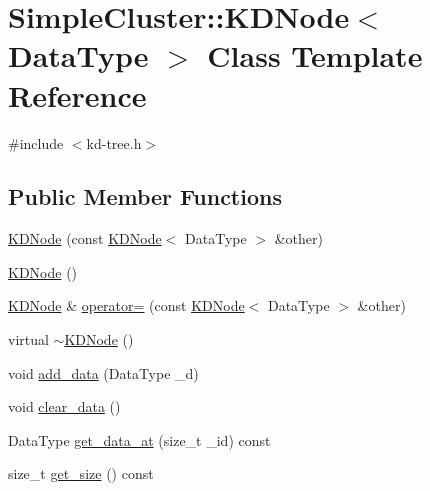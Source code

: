\hypertarget{classSimpleCluster_1_1KDNode}{\section{Simple\+Cluster\+:\+:K\+D\+Node$<$ Data\+Type $>$ Class Template Reference}
\label{classSimpleCluster_1_1KDNode}
}


{\ttfamily \#include $<$kd-\/tree.\+h$>$}

\subsection*{Public Member Functions}
\begin{DoxyCompactItemize}
\item 
\hyperlink{classSimpleCluster_1_1KDNode_a1722141bf4dab3bb456e0a119c61f4eb}{K\+D\+Node} (const \hyperlink{classSimpleCluster_1_1KDNode}{K\+D\+Node}$<$ Data\+Type $>$ \&other)
\item 
\hyperlink{classSimpleCluster_1_1KDNode_acd1e07a0d8bd2d5b9631c4d42cee7e72}{K\+D\+Node} ()
\item 
\hyperlink{classSimpleCluster_1_1KDNode}{K\+D\+Node} \& \hyperlink{classSimpleCluster_1_1KDNode_a7719d6922448ee1c3c4f777117ce48a0}{operator=} (const \hyperlink{classSimpleCluster_1_1KDNode}{K\+D\+Node}$<$ Data\+Type $>$ \&other)
\item 
virtual \hyperlink{classSimpleCluster_1_1KDNode_a997a7e9b6cb385f9a8978a081244f34b}{$\sim$\+K\+D\+Node} ()
\item 
void \hyperlink{classSimpleCluster_1_1KDNode_ab5ab826e385427c782eca75bb579df31}{add\+\_\+data} (Data\+Type \+\_\+d)
\item 
void \hyperlink{classSimpleCluster_1_1KDNode_af8cb50f3b2e976537667ed84984b4a84}{clear\+\_\+data} ()
\item 
Data\+Type \hyperlink{classSimpleCluster_1_1KDNode_ac18f6502b432eb3dbb4c3e044a337eb4}{get\+\_\+data\+\_\+at} (size\+\_\+t \+\_\+id) const 
\item 
size\+\_\+t \hyperlink{classSimpleCluster_1_1KDNode_ab06c42728e2c9eaaae39efcf7a70b736}{get\+\_\+size} () const 
\end{DoxyCompactItemize}
